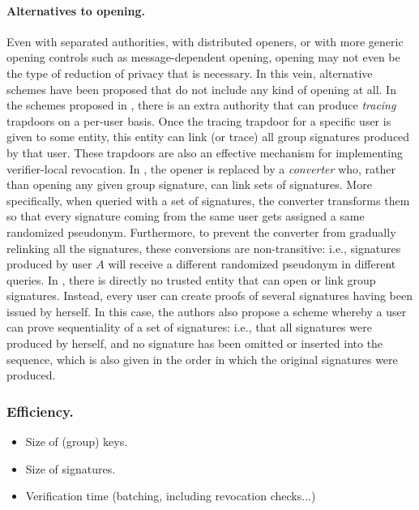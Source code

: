 \paragraph{Alternatives to opening.}
%
Even with separated authorities, with distributed openers, or with more generic
opening controls such as message-dependent opening, opening may not even be
the type of reduction of privacy that is necessary. In this vein, alternative
schemes have been proposed that do not include any kind of
opening at all.
%
In the schemes proposed in \cite{kty04,cpy06,bcly08}, there is an extra
authority that can produce \emph{tracing} trapdoors on a per-user basis.
Once the tracing trapdoor for a specific user is given to some entity, this
entity can link (or trace) all group signatures produced by that user.
These trapdoors are also an effective mechanism for implementing verifier-local
revocation.
%
In \cite{gl19}, the opener is replaced by a \emph{converter} who, rather than
opening any given group signature, can link sets of signatures. More
specifically, when queried with a set of signatures, the converter transforms
them so that every signature coming from the same user gets assigned a same
randomized pseudonym. Furthermore, to prevent the converter from gradually
relinking all the signatures, these conversions are non-transitive: i.e.,
signatures produced by user $A$ will receive a different randomized pseudonym in
different queries.
%
In \cite{dl21}, there is directly no trusted entity that can open or link group
signatures. Instead, every user can create proofs of several signatures having
been issued by herself. In this case, the authors also propose a scheme whereby
a user can prove sequentiality of a set of signatures: i.e., that all signatures
were produced by herself, and no signature has been omitted or inserted into the
sequence, which is also given in the order in which the original signatures were
produced.

\subsubsection{Efficiency.}

\begin{itemize}
\item Size of (group) keys.
\item Size of signatures.
\item Verification time (batching, including revocation checks...)
\end{itemize}

